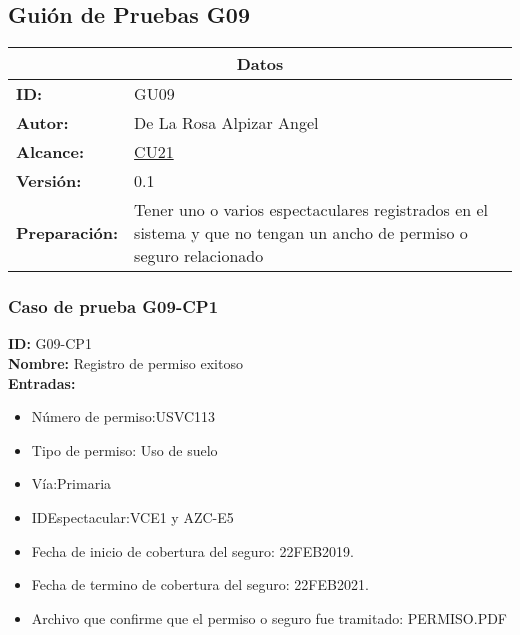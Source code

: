 \subsection{Guión de Pruebas G09}
\begin{table}[htbp]
\centering
\begin{tabular}{| p{5cm}| p{13cm} |} \hline
\multicolumn{2}{|c|}{\textbf{Datos}} \\ \hline
    \textbf{ID:}&GU09\\ \hline
    \textbf{Autor:}&De La Rosa Alpizar Angel\\ \hline
    \textbf{Alcance:}&
    \hyperlink{CU:CU21}{CU21}\\ \hline
    \textbf{Versión:}&0.1\\ \hline
    \textbf{Preparación:}&Tener uno o varios espectaculares registrados en el sistema y que no tengan un ancho de permiso o seguro relacionado\\ \hline
\end{tabular}
\end{table}

\subsubsection{Caso de prueba G09-CP1}
\textbf{ID:} G09-CP1\\
\textbf{Nombre:} Registro de permiso exitoso\\
\textbf{Entradas:}
\begin{itemize}
    \item Número de permiso:USVC113
    \item Tipo de permiso: Uso de suelo
    \item Vía:Primaria 
	\item IDEspectacular:VCE1 y AZC-E5
	\item Fecha de inicio de cobertura del seguro: 22FEB2019.
	\item Fecha de termino de cobertura del seguro: 22FEB2021.
	\item Archivo que confirme que el permiso o seguro fue tramitado: PERMISO.PDF
\end{itemize}	

